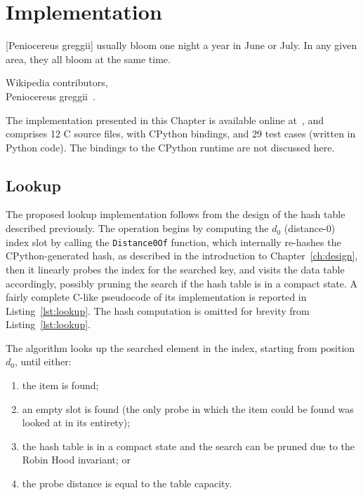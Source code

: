 \chapter{Implementation}\label{ch:implementation}

\epigraph{%
    [Peniocereus greggii] usually bloom one night a year in June or July.
    In any given area, they all bloom at the same time.
}{Wikipedia contributors,\\Peniocereus greggii~\cite{peniocereus-greggii}.}

The implementation presented in this Chapter is available online at~\cite[src/cereggii/atomic\_dict]{cereggii}, and comprises 12 C source files, with CPython bindings, and 29 test cases (written in Python code).
The bindings to the CPython runtime are not discussed here.


\section{Lookup}\label{sec:lookup}

The proposed lookup implementation follows from the design of the hash table described previously.
The operation begins by computing the $d_0$ (distance-0) index slot by calling the \texttt{Distance0Of} function, which internally re-hashes the CPython-generated hash, as described in the introduction to Chapter~\ref{ch:design}, then it linearly probes the index for the searched key, and visits the data table accordingly, possibly pruning the search if the hash table is in a compact state.
A fairly complete C-like pseudocode of its implementation is reported in Listing~\ref{lst:lookup}.
The hash computation is omitted for brevity from Listing~\ref{lst:lookup}.

The algorithm looks up the searched element in the index, starting from position $d_0$, until either:
\begin{enumerate}
    \item the item is found;
    \item an empty slot is found (the only probe in which the item could be found was looked at in its entirety);
    \item the hash table is in a compact state and the search can be pruned due to the Robin Hood invariant; or
    \item the probe distance is equal to the table capacity.
\end{enumerate}

